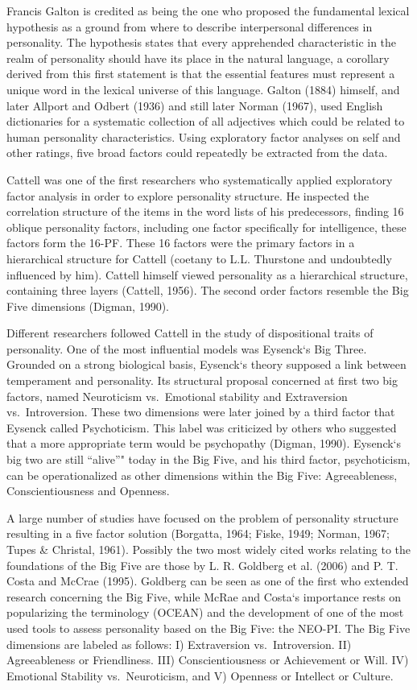 \documentclass[,man,floatsintext]{apa6}
\begin{document}
Francis Galton is credited as being the one who proposed the fundamental
lexical hypothesis as a ground from where to describe interpersonal
differences in personality. The hypothesis states that every apprehended
characteristic in the realm of personality should have its place in the
natural language, a corollary derived from this first statement is that
the essential features must represent a unique word in the lexical
universe of this language. Galton (1884) himself, and later Allport and
Odbert (1936) and still later Norman (1967), used English dictionaries
for a systematic collection of all adjectives which could be related to
human personality characteristics. Using exploratory factor analyses on
self and other ratings, five broad factors could repeatedly be extracted
from the data.

Cattell was one of the first researchers who systematically applied
exploratory factor analysis in order to explore personality structure.
He inspected the correlation structure of the items in the word lists of
his predecessors, finding 16 oblique personality factors, including one
factor specifically for intelligence, these factors form the 16-PF.
These 16 factors were the primary factors in a hierarchical structure
for Cattell (coetany to L.L. Thurstone and undoubtedly influenced by
him). Cattell himself viewed personality as a hierarchical structure,
containing three layers (Cattell, 1956). The second order factors
resemble the Big Five dimensions (Digman, 1990).

Different researchers followed Cattell in the study of dispositional
traits of personality. One of the most influential models was Eysenck`s
Big Three. Grounded on a strong biological basis, Eysenck`s theory
supposed a link between temperament and personality. Its structural
proposal concerned at first two big factors, named Neuroticism
vs.~Emotional stability and Extraversion vs.~Introversion. These two
dimensions were later joined by a third factor that Eysenck called
Psychoticism. This label was criticized by others who suggested that a
more appropriate term would be psychopathy (Digman, 1990). Eysenck`s big
two are still \enquote{alive}" today in the Big Five, and his third
factor, psychoticism, can be operationalized as other dimensions within
the Big Five: Agreeableness, Conscientiousness and Openness.

A large number of studies have focused on the problem of personality
structure resulting in a five factor solution (Borgatta, 1964; Fiske,
1949; Norman, 1967; Tupes \& Christal, 1961). Possibly the two most
widely cited works relating to the foundations of the Big Five are those
by L. R. Goldberg et al. (2006) and P. T. Costa and McCrae (1995).
Goldberg can be seen as one of the first who extended research
concerning the Big Five, while McRae and Costa`s importance rests on
popularizing the terminology (OCEAN) and the development of one of the
most used tools to assess personality based on the Big Five: the NEO-PI.
The Big Five dimensions are labeled as follows: I) Extraversion
vs.~Introversion. II) Agreeableness or Friendliness. III)
Conscientiousness or Achievement or Will. IV) Emotional Stability
vs.~Neuroticism, and V) Openness or Intellect or Culture.
\end{document}
